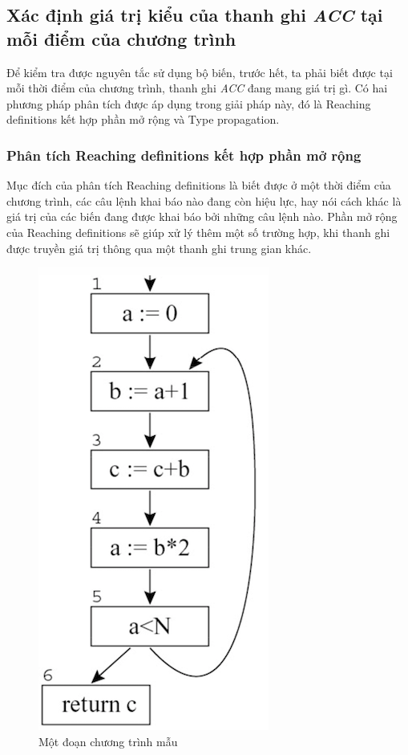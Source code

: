\subsection{Xác định giá trị kiểu của thanh ghi \textit{ACC} tại mỗi điểm của chương trình}
Để kiểm tra được nguyên tắc sử dụng bộ biến, trước hết, ta phải biết được tại mỗi thời điểm của chương trình, thanh ghi \textit{ACC} đang mang giá trị gì. Có hai phương pháp phân tích được áp dụng trong giải pháp này, đó là Reaching definitions kết hợp phần mở rộng và Type propagation.
\subsubsection{Phân tích Reaching definitions kết hợp phần mở rộng}
Mục đích của phân tích Reaching definitions là biết được ở một thời điểm của chương trình, các câu lệnh khai báo nào đang còn hiệu lực, hay nói cách khác là giá trị của các biến đang được khai báo bởi những câu lệnh nào. Phần mở rộng của Reaching definitions sẽ giúp xử lý thêm một số trường hợp, khi thanh ghi được truyền giá trị thông qua một thanh ghi trung gian khác.
\begin{figure}[h!]
	\centering
	\includegraphics[scale=0.75]{image/reachingDefExam}
	\caption{Một đoạn chương trình mẫu}
	\label{fig:reachingdefexam}
\end{figure}

